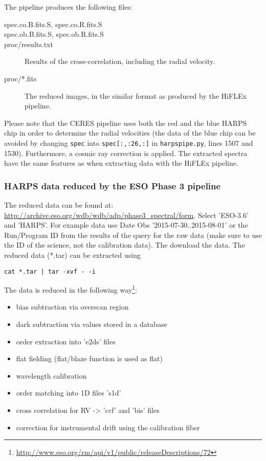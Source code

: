 \documentclass[10pt,a4paper]{article}
\begin{document}
The pipeline produces the following files:
\begin{description}
  \item[spec.co.B.fits.S, spec.co.R.fits.S] 
  \item[spec.ob.B.fits.S, spec.ob.R.fits.S] 
  \item[proc/results.txt] Results of the cross-correlation, including the radial velocity.
  \item[proc/*.fits] The reduced images, in the similar format as produced by the HiFLEx pipeline.
\end{description}

Please note that the CERES pipeline uses both the red and the blue HARPS chip in order to determine the radial velocities (the data of the blue chip can be avoided by changing \verb|spec| into \verb|spec[:,:26,:]| in \verb|harpspipe.py|, lines 1507 and 1530). Furthermore, a cosmic ray correction is applied. The extracted spectra have the same features as when extracting data with the HiFLEx pipeline.


\subsubsection{HARPS data reduced by the ESO Phase 3 pipeline}
The reduced data can be found at: \url{http://archive.eso.org/wdb/wdb/adp/phase3_spectral/form}. Select 'ESO-3.6' and 'HARPS'. For example data use Date Obs '2015-07-30..2015-08-01' or the Run/Program ID from the results of the query for the raw data (make sure to use the ID of the science, not the calibration data). The download the data. The reduced data (*.tar) can be extracted using
\begin{lstlisting}[style=base]
cat *.tar | tar -xvf - -i
\end{lstlisting}

The data is reduced in the following way\footnote{\url{http://www.eso.org/rm/api/v1/public/releaseDescriptions/72}}:
\begin{itemize}\setlength\itemsep{0em}
  \item bias subtraction via overscan region
  \item dark subtraction via values stored in a database
  \item order extraction into 'e2ds' files
  \item flat fielding (flat/blaze function is used as flat)
  \item wavelength calibration
  \item order matching into 1D files 's1d'
  \item cross correlation for RV -> 'ccf' and 'bis' files
  \item correction for instrumental drift using the calibration fiber
\end{itemize}
\end{document}
